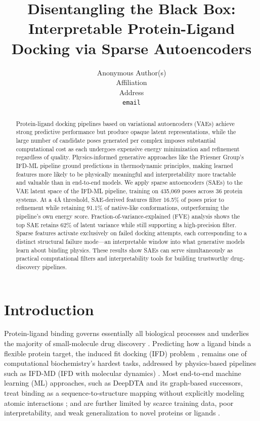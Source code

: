 \documentclass{article}
\title{Disentangling the Black Box: Interpretable Protein-Ligand Docking via Sparse Autoencoders}
\author{%
  Anonymous Author(s) \\
  Affiliation \\
  Address \\
  \texttt{email} \\
}
\begin{document}
\maketitle

\begin{abstract}
Protein-ligand docking pipelines based on variational autoencoders (VAEs) achieve strong predictive performance but produce opaque latent representations, while the large number of candidate poses generated per complex imposes substantial computational cost as each undergoes expensive energy minimization and refinement regardless of quality. Physics-informed generative approaches like the Friesner Group's IFD-ML pipeline ground predictions in thermodynamic principles, making learned features more likely to be physically meaningful and interpretability more tractable and valuable than in end-to-end models. We apply sparse autoencoders (SAEs) to the VAE latent space of the IFD-ML pipeline, training on 435,069 poses across 36 protein systems. At a 4Å threshold, SAE-derived features filter 16.5\% of poses prior to refinement while retaining 91.1\% of native-like conformations, outperforming the pipeline's own energy score. Fraction-of-variance-explained (FVE) analysis shows the top SAE retains 62\% of latent variance while still supporting a high-precision filter. Sparse features activate exclusively on failed docking attempts, each corresponding to a distinct structural failure mode---an interpretable window into what generative models learn about binding physics. These results show SAEs can serve simultaneously as practical computational filters and interpretability tools for building trustworthy drug-discovery pipelines.
\end{abstract}

\section{Introduction}
Protein-ligand binding governs essentially all biological processes and underlies the majority of small-molecule drug discovery \citep{dhakal2022,sim2025}. Predicting how a ligand binds a flexible protein target, the induced fit docking (IFD) problem \citep{sherman2006}, remains one of computational biochemistry's hardest tasks, addressed by physics-based pipelines such as IFD-MD (IFD with molecular dynamics) \citep{miller2021}. Most end-to-end machine learning (ML) approaches, such as DeepDTA and its graph-based successors, treat binding as a sequence-to-structure mapping without explicitly modeling atomic interactions \citep{wu2025}; and are further limited by scarce training data, poor interpretability, and weak generalization to novel proteins or ligands \citep{lam2025,jiang2026}.
\end{document}
